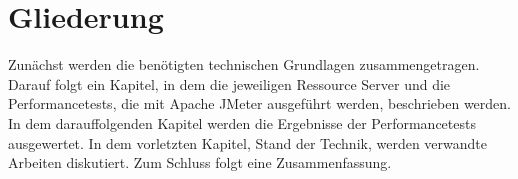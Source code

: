 %
%
\section{Gliederung}
\label{sec:intro:structure}
Zunächst werden die benötigten technischen Grundlagen zusammengetragen. Darauf folgt ein Kapitel, in dem die jeweiligen Ressource Server und die Performancetests, die mit Apache JMeter ausgeführt werden, beschrieben werden. In dem darauffolgenden Kapitel werden die Ergebnisse der Performancetests ausgewertet. In dem vorletzten Kapitel, Stand der Technik, werden verwandte Arbeiten diskutiert. Zum Schluss folgt eine Zusammenfassung. 

